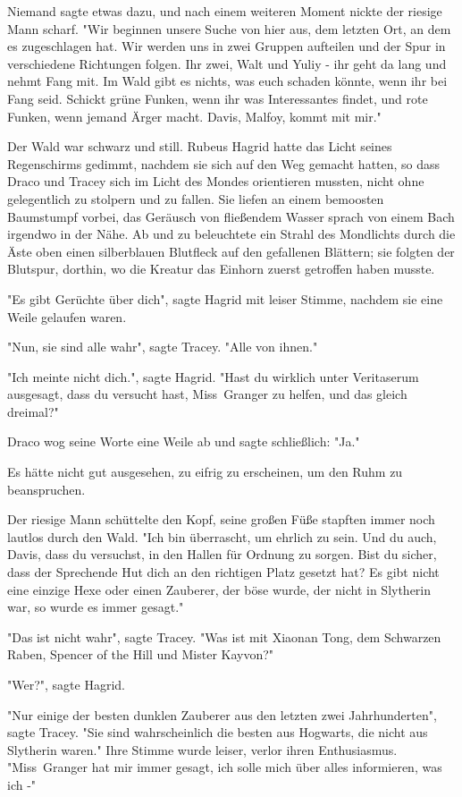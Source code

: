{Niemand sagte etwas dazu, und nach einem weiteren Moment nickte der riesige Mann scharf. "Wir beginnen unsere Suche von hier aus, dem letzten Ort, an dem es zugeschlagen hat. Wir werden uns in zwei Gruppen aufteilen und der Spur in verschiedene Richtungen folgen. Ihr zwei, Walt und Yuliy - ihr geht da lang und nehmt Fang mit. Im Wald gibt es nichts, was euch schaden könnte, wenn ihr bei Fang seid. Schickt grüne Funken, wenn ihr was Interessantes findet, und rote Funken, wenn jemand Ärger macht. Davis, Malfoy, kommt mit mir."

Der Wald war schwarz und still. Rubeus Hagrid hatte das Licht seines Regenschirms gedimmt, nachdem sie sich auf den Weg gemacht hatten, so dass Draco und Tracey sich im Licht des Mondes orientieren mussten, nicht ohne gelegentlich zu stolpern und zu fallen. Sie liefen an einem bemoosten Baumstumpf vorbei, das Geräusch von fließendem Wasser sprach von einem Bach irgendwo in der Nähe. Ab und zu beleuchtete ein Strahl des Mondlichts durch die Äste oben einen silberblauen Blutfleck auf den gefallenen Blättern; sie folgten der Blutspur, dorthin, wo die Kreatur das Einhorn zuerst getroffen haben musste.

"Es gibt Gerüchte über dich", sagte Hagrid mit leiser Stimme, nachdem sie eine Weile gelaufen waren.

"Nun, sie sind alle wahr", sagte Tracey. "Alle von ihnen."

"Ich meinte nicht dich.", sagte Hagrid. "Hast du wirklich unter Veritaserum ausgesagt, dass du versucht hast, Miss~Granger zu helfen, und das gleich dreimal?"

Draco wog seine Worte eine Weile ab und sagte schließlich: "Ja."

Es hätte nicht gut ausgesehen, zu eifrig zu erscheinen, um den Ruhm zu beanspruchen.

Der riesige Mann schüttelte den Kopf, seine großen Füße stapften immer noch lautlos durch den Wald. "Ich bin überrascht, um ehrlich zu sein. Und du auch, Davis, dass du versuchst, in den Hallen für Ordnung zu sorgen. Bist du sicher, dass der Sprechende Hut dich an den richtigen Platz gesetzt hat? Es gibt nicht eine einzige Hexe oder einen Zauberer, der böse wurde, der nicht in Slytherin war, so wurde es immer gesagt."

"Das ist nicht wahr", sagte Tracey. "Was ist mit Xiaonan Tong, dem Schwarzen Raben, Spencer of the Hill und Mister Kayvon?"

"Wer?", sagte Hagrid.

"Nur einige der besten dunklen Zauberer aus den letzten zwei Jahrhunderten", sagte Tracey. "Sie sind wahrscheinlich die besten aus Hogwarts, die nicht aus Slytherin waren." Ihre Stimme wurde leiser, verlor ihren Enthusiasmus. "Miss~Granger hat mir immer gesagt, ich solle mich über alles informieren, was ich -"

}
